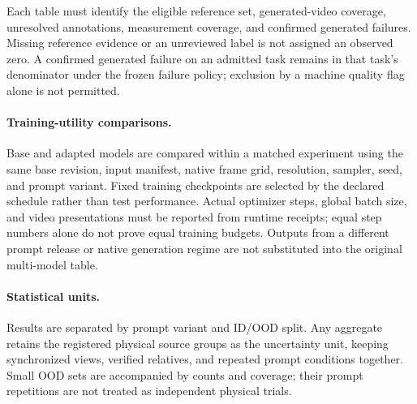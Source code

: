 Each table must identify the eligible reference set, generated-video
coverage, unresolved annotations, measurement coverage, and confirmed
generated failures. Missing reference evidence or an unreviewed label is not
assigned an observed zero. A confirmed generated failure on an admitted task
remains in that task's denominator under the frozen failure policy; exclusion
by a machine quality flag alone is not permitted.

\paragraph{Training-utility comparisons.}
Base and adapted models are compared within a matched experiment using the
same base revision, input manifest, native frame grid, resolution, sampler,
seed, and prompt variant. Fixed training checkpoints are selected by the
declared schedule rather than test performance. Actual optimizer steps,
global batch size, and video presentations must be reported from runtime
receipts; equal step numbers alone do not prove equal training budgets.
Outputs from a different prompt release or native generation regime are not
substituted into the original multi-model table.

\paragraph{Statistical units.}
Results are separated by prompt variant and ID/OOD split. Any aggregate
retains the registered physical source groups as the uncertainty unit,
keeping synchronized views, verified relatives, and repeated prompt
conditions together. Small OOD sets are accompanied by counts and coverage;
their prompt repetitions are not treated as independent physical trials.

